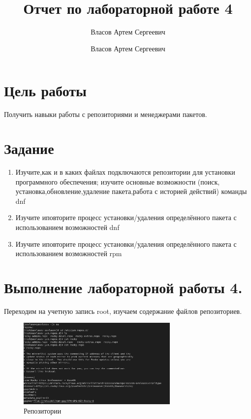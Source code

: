 \documentclass[
  12pt,
  a4paper,
  DIV=11,
  numbers=noendperiod]{scrreprt}
\title{Отчет по лабораторной работе 4}
\subtitle{Власов Артем Сергеевич}
\author{Власов Артем Сергеевич}
\date{}
\providecommand{\tightlist}{%
  \setlength{\itemsep}{0pt}\setlength{\parskip}{0pt}}\usepackage{longtable,booktabs,array}
\renewcommand*\contentsname{Содержание}
\newcommand\contentsname{Содержание}
\begin{document}
\maketitle

\renewcommand*\contentsname{Содержание}
{
\setcounter{tocdepth}{1}
\tableofcontents
}
\listoffigures
\listoftables
{}
\chapter{Цель
работы}\label{ux446ux435ux43bux44c-ux440ux430ux431ux43eux442ux44b}

Получить навыки работы с репозиториями и менеджерами пакетов.

\chapter{Задание}\label{ux437ux430ux434ux430ux43dux438ux435}

\begin{enumerate}
\def\labelenumi{\arabic{enumi}.}
\tightlist
\item
  Изучите,как и в каких файлах подключаются репозитории для установки
  программного обеспечения; изучите основные возможности (поиск,
  установка,обновление,удаление пакета,работа с историей действий)
  команды dnf
\item
  Изучите иповторите процесс установки/удаления определённого пакета с
  использованием возможностей dnf
\item
  Изучите иповторите процесс установки/удаления определённого пакета с
  использованием возможностей rpm
\end{enumerate}

\chapter{Выполнение лабораторной работы
4.}\label{ux432ux44bux43fux43eux43bux43dux435ux43dux438ux435-ux43bux430ux431ux43eux440ux430ux442ux43eux440ux43dux43eux439-ux440ux430ux431ux43eux442ux44b-4.}

Переходим на учетную запись root, изучаем содержание файлов
репозиториев.

\begin{figure}

{\centering \includegraphics[width=0.7\textwidth,height=\textheight]{image/1.png}

}

\caption{Репозитории}

\end{figure}%
\end{document}
